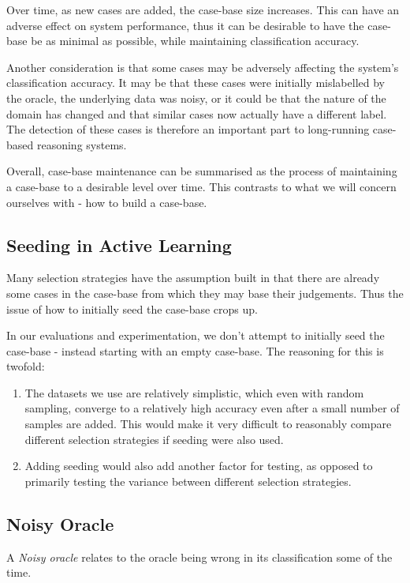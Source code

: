 \documentclass[a4paper,11pt]{report}
\begin{document}
Over time, as new cases are added, the case-base size increases. This can have an adverse effect on system performance, thus it can be desirable to have the case-base be as minimal as possible, while maintaining classification accuracy.

Another consideration is that some cases may be adversely affecting the system's classification accuracy. It may be that these cases were initially mislabelled by the oracle, the underlying data was noisy, or it could be that the nature of the domain has changed and that similar cases now actually have a different label. The detection of these cases is therefore an important part to long-running case-based reasoning systems.

Overall, case-base maintenance can be summarised as the process of maintaining a case-base to a desirable level over time. This contrasts to what we will concern ourselves with - how to build a case-base.

\subsection{Seeding in Active Learning}
Many selection strategies have the assumption built in that there are already some cases in the case-base from which they may base their judgements. Thus the issue of how to initially seed the case-base crops up.

In our evaluations and experimentation, we don't attempt to initially seed the case-base - instead starting with an empty case-base. The reasoning for this is twofold: 
\begin{enumerate}
	\item The datasets we use are relatively simplistic, which even with random sampling, converge to a relatively high accuracy even after a small number of samples are added. This would make it very difficult to reasonably compare different selection strategies if seeding were also used. 
	\item Adding seeding would also add another factor for testing, as opposed to primarily testing the variance between different selection strategies.
\end{enumerate}

\subsection{Noisy Oracle}
A \emph{Noisy oracle} relates to the oracle being wrong in its classification some of the time.
\end{document}
